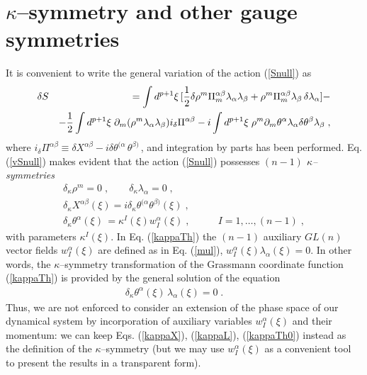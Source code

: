 \documentclass[a4paper,11pt]{article}
\begin{document}
\section{$\kappa$--symmetry and other gauge symmetries} 
It  
is convenient to write the general variation 
of the action (\ref{Snull}) as   
\begin{eqnarray}\label{vSnull} 
& \delta S & = 
\int d^{p+1}\xi \, [ {1\over 2} \delta \rho^m \Pi_m^{\alpha\beta} 
\lambda_{\alpha}\lambda_{\beta}
+ \rho^m \Pi_m^{\alpha\beta} 
\lambda_{\beta} \, \delta  \lambda_{\alpha}] - 
\nonumber  \\ 
& & - {1\over 2}
\int d^{p+1}\xi \; \partial_m (\rho^m
\lambda_{\alpha}\lambda_{\beta})  i_\delta \Pi^{\alpha\beta} -
  i \int d^{p+1}\xi \; \rho^m  \partial_m \theta^{\alpha} 
\lambda_{\alpha}  \delta \theta^{\beta} 
\lambda_{\beta} \; ,   
\end{eqnarray}
where 
$i_\delta \Pi^{\alpha\beta} \equiv \delta X^{\alpha\beta} - 
i \delta\theta^{(\alpha} \, \theta^{\beta )}\,$,    
and integration by parts has been performed. 
Eq. (\ref{vSnull}) makes evident that  the action (\ref{Snull}) possesses 
{\sl $(n-1)$ $\kappa$--symmetries} 
\begin{eqnarray}
\label{kappaL} 
\delta_{\kappa} \rho^m = 0 \; , \qquad \delta_{\kappa} \lambda_{\alpha}=0 \; ,
& \\ 
\label{kappaX} 
\delta_{\kappa} X^{\alpha\beta}(\xi) = 
i\delta_{\kappa}\theta^{(\alpha}\theta^{\beta )}(\xi)\; , 
\quad &
\\ \label{kappaTh} 
\delta_{\kappa} \theta^{\alpha}(\xi)\,= \kappa^I(\xi) w_I^{\alpha}(\xi) 
\; , \qquad & I=1,\ldots , (n-1)\;  ,  
\end{eqnarray} 
with parameters $\kappa^I(\xi)$. 
In Eq. (\ref{kappaTh}) the $(n-1)$ auxiliary  
$GL(n)$ vector fields  $w_I^{\alpha}(\xi)$ are defined as in  Eq. (\ref{mul}), 
$w_I^{\alpha}(\xi) \lambda_{\alpha}(\xi)=0$.
In other words, 
the $\kappa$--symmetry transformation of 
the Grassmann  coordinate function (\ref{kappaTh}) is provided by the 
general solution of the equation
\begin{eqnarray}
\label{kappaTh0} 
\delta_{\kappa} \theta^{\alpha}(\xi)\, \lambda_{\alpha}(\xi) =0
\; . \qquad 
\end{eqnarray}
Thus, we are not enforced to consider an extension of the phase space of our 
dynamical system by incorporation of auxiliary variables 
$w^{\alpha}_I(\xi)$ and their momentum: we     
can keep Eqs. (\ref{kappaX}), (\ref{kappaL}), 
(\ref{kappaTh0}) instead as the definition of the $\kappa$--symmetry 
(but we may use $w^{\alpha}_I(\xi)$ as a convenient tool 
to present the results in  a transparent form).  
\end{document}
